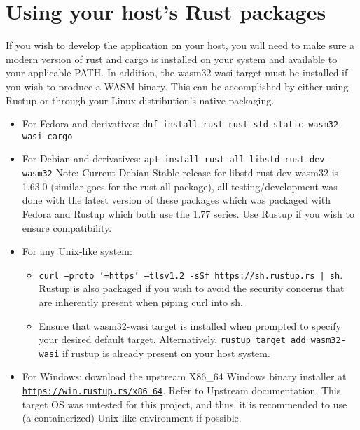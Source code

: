 \section{Using your host's Rust packages}
If you wish to develop the application on your host, you will need to make sure a modern version of rust and cargo is installed on your system and available to your applicable PATH. In addition, the wasm32-wasi target must be installed if you wish to produce a WASM binary. This can be accomplished by either using Rustup or through your Linux distribution's native packaging.
\begin{itemize}
    \item For Fedora and derivatives: \texttt{dnf install rust rust-std-static-wasm32-wasi cargo}
    \item For Debian and derivatives: \texttt{apt install rust-all libstd-rust-dev-wasm32} \break Note: Current Debian Stable release for libstd-rust-dev-wasm32 is 1.63.0 (similar goes for the rust-all package), all testing/development was done with the latest version of these packages which was packaged with Fedora and Rustup which both use the 1.77 series. Use Rustup if you wish to ensure compatibility.
    \item For any Unix-like system:
    \begin{itemize}
        \item \texttt{curl --proto '=https' --tlsv1.2 -sSf https://sh.rustup.rs | sh}. Rustup is also packaged if you wish to avoid the security concerns that are inherently present when piping curl into sh.
        \item Ensure that wasm32-wasi target is installed when prompted to specify your desired default target. Alternatively, \texttt{rustup target add wasm32-wasi} if rustup is already present on your host system. 
    \end{itemize}
    \item For Windows: download the upstream X86\_64 Windows binary installer at \href{https://win.rustup.rs/x86_64}{\nolinkurl{https://win.rustup.rs/x86\_64}}. Refer to Upstream documentation. This target OS was untested for this project, and thus, it is recommended to use (a containerized) Unix-like environment if possible.
\end{itemize}
